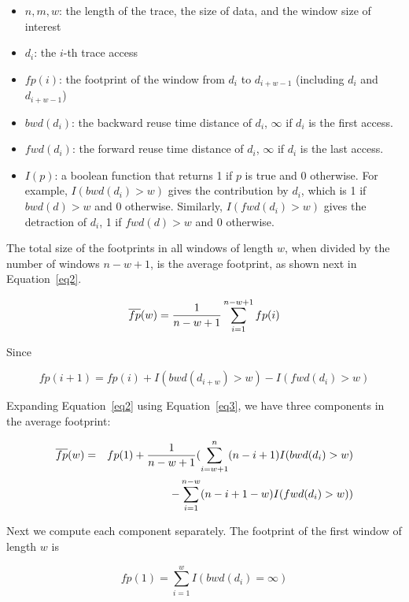 \begin{itemize}
\item $n, m, w$: the length of the trace, the size of data, and the
  window size of interest
\item $d_i$:  the $i$-th trace access
\item $fp(i)$: the footprint of the window from $d_i$ to $d_{i+w-1}$
  (including $d_i$ and $d_{i+w-1}$)
\item $bwd(d_i)$: the backward reuse time distance of $d_i$, $\infty$ if
  $d_i$ is the first access.
\item $fwd(d_i)$: the forward reuse time distance of $d_i$, $\infty$ if
  $d_i$ is the last access.
\item $I(p)$: a boolean function that returns 1 if $p$ is true and 0
  otherwise.  For example, $I(bwd(d_i)>w)$ gives the contribution by
  $d_i$, which is 1 if $bwd(d)>w$ and 0 otherwise.  Similarly,
  $I(fwd(d_i)>w)$ gives the detraction of $d_i$, 1 if $fwd(d)>w$ and 0
  otherwise.
\end{itemize}

The total size of the footprints in all windows of length $w$, when divided by the
number of windows $n-w+1$, is the average footprint, as shown next
in Equation~\ref{eq2}.

\begin{equation}
\label{eq2}
\small
\overline{fp}(w)= \frac{1}{n-w+1}\sum_{i=1}^{n-w+1}fp(i)
\end{equation}

\noindent Since 

\begin{equation}
\label{eq3}
fp(i+1) = fp(i)+I(bwd(d_{i+w})>w)-I(fwd(d_i)>w)
\end{equation}

\noindent Expanding Equation~\ref{eq2} using Equation~\ref{eq3},
we have three components in the average footprint:

\begin{eqnarray}
\label{eq4}
\small
&\overline{fp}(w) = & fp(1) + \frac{1}{n-w+1} (\sum_{i=w+1}^{n}(n-i+1)I(bwd(d_i)>w)  \nonumber \\
& & - \sum_{i=1}^{n-w}(n-i+1-w)I(fwd(d_i)>w) )
\end{eqnarray}

Next we compute each component separately. The footprint of the first
window of length $w$ is 
 
\begin{equation}
\label{eq5}
fp(1)=\sum_{i=1}^{w}I(bwd(d_i)=\infty)
\end{equation}

